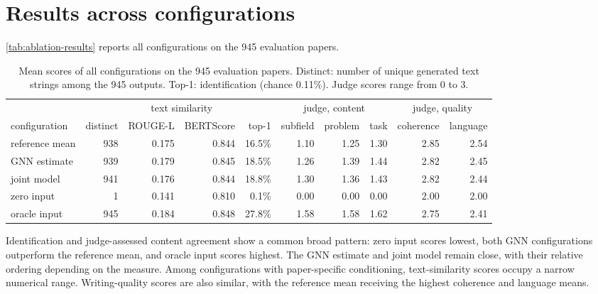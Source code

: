 \section{Results across configurations}
\label{sec:ablation-results}

\autoref{tab:ablation-results} reports all configurations on the 945 evaluation papers.

\begin{table}[!ht]
  \centering
  \footnotesize
  \setlength{\tabcolsep}{3.5pt}
  \begin{tabular}{@{}lrrrrrrrrr@{}}
    \toprule
    & & \multicolumn{2}{c}{text similarity} & & \multicolumn{3}{c}{judge, content} & \multicolumn{2}{c}{judge, quality} \\
    \cmidrule(lr){3-4} \cmidrule(lr){6-8} \cmidrule(l){9-10}
    configuration & distinct & ROUGE-L & BERTScore & top-1 & subfield & problem & task & coherence & language \\
    \midrule
    reference mean & 938 & 0.175 & 0.844 & 16.5\% & 1.10 & 1.25 & 1.30 & 2.85 & 2.54 \\
    GNN estimate & 939 & 0.179 & 0.845 & 18.5\% & 1.26 & 1.39 & 1.44 & 2.82 & 2.45 \\
    joint model & 941 & 0.176 & 0.844 & 18.8\% & 1.30 & 1.36 & 1.43 & 2.82 & 2.44 \\
    \midrule
    zero input & 1 & 0.141 & 0.810 & 0.1\% & 0.00 & 0.00 & 0.00 & 2.00 & 2.00 \\
    oracle input & 945 & 0.184 & 0.848 & 27.8\% & 1.58 & 1.58 & 1.62 & 2.75 & 2.41 \\
    \bottomrule
  \end{tabular}
  \caption{Mean scores of all configurations on the 945 evaluation papers. Distinct: number of unique generated text strings among the 945 outputs. Top-1: identification (chance 0.11\%). Judge scores range from 0 to 3.}
  \label{tab:ablation-results}
\end{table}

Identification and judge-assessed content agreement show a common broad pattern: zero input scores lowest, both GNN configurations outperform the reference mean, and oracle input scores highest. The GNN estimate and joint model remain close, with their relative ordering depending on the measure. Among configurations with paper-specific conditioning, text-similarity scores occupy a narrow numerical range. Writing-quality scores are also similar, with the reference mean receiving the highest coherence and language means.

